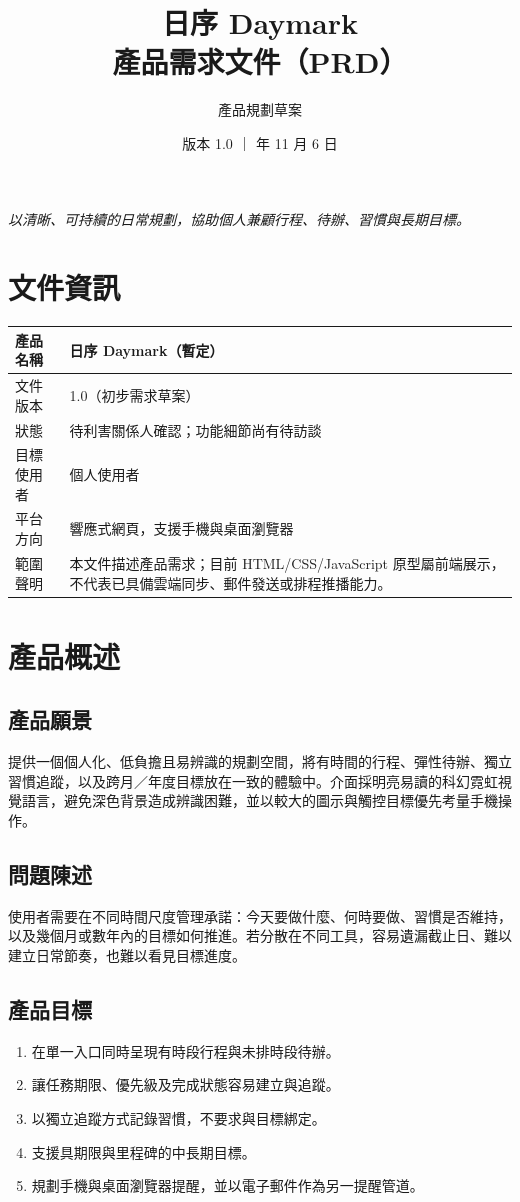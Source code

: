 \documentclass[12pt]{article}
\title{日序 Daymark\個人行程與任務管理系統\\產品需求文件（PRD）}
\author{產品規劃草案}
\date{版本 1.0 \quad｜\quad 2026 年 11 月 6 日}
\begin{document}
\maketitle
\begin{center}\textit{以清晰、可持續的日常規劃，協助個人兼顧行程、待辦、習慣與長期目標。}\end{center}
\tableofcontents\newpage
\section{文件資訊}
\begin{tabular}{p{3cm}p{10cm}}\toprule
產品名稱 & 日序 Daymark（暫定）\\\midrule
文件版本 & 1.0（初步需求草案）\\
狀態 & 待利害關係人確認；功能細節尚有待訪談\\
目標使用者 & 個人使用者\\
平台方向 & 響應式網頁，支援手機與桌面瀏覽器\\
範圍聲明 & 本文件描述產品需求；目前 HTML/CSS/JavaScript 原型屬前端展示，不代表已具備雲端同步、郵件發送或排程推播能力。\\\bottomrule\end{tabular}
\section{產品概述}
\subsection{產品願景}
提供一個個人化、低負擔且易辨識的規劃空間，將有時間的行程、彈性待辦、獨立習慣追蹤，以及跨月／年度目標放在一致的體驗中。介面採明亮易讀的科幻霓虹視覺語言，避免深色背景造成辨識困難，並以較大的圖示與觸控目標優先考量手機操作。
\subsection{問題陳述}
使用者需要在不同時間尺度管理承諾：今天要做什麼、何時要做、習慣是否維持，以及幾個月或數年內的目標如何推進。若分散在不同工具，容易遺漏截止日、難以建立日常節奏，也難以看見目標進度。
\subsection{產品目標}
\begin{enumerate}
\item 在單一入口同時呈現有時段行程與未排時段待辦。
\item 讓任務期限、優先級及完成狀態容易建立與追蹤。
\item 以獨立追蹤方式記錄習慣，不要求與目標綁定。
\item 支援具期限與里程碑的中長期目標。
\item 規劃手機與桌面瀏覽器提醒，並以電子郵件作為另一提醒管道。
\end{enumerate}
\end{document}
